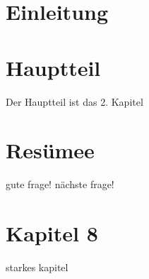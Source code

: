 \documentclass[11pt,a4paper]{article}
\begin{document}
\section{Einleitung}

\section{Hauptteil}

Der Hauptteil ist das 2. Kapitel

\section{Resümee}

gute frage!
nächste frage!


\section{Kapitel 8}
starkes kapitel
\end{document}
